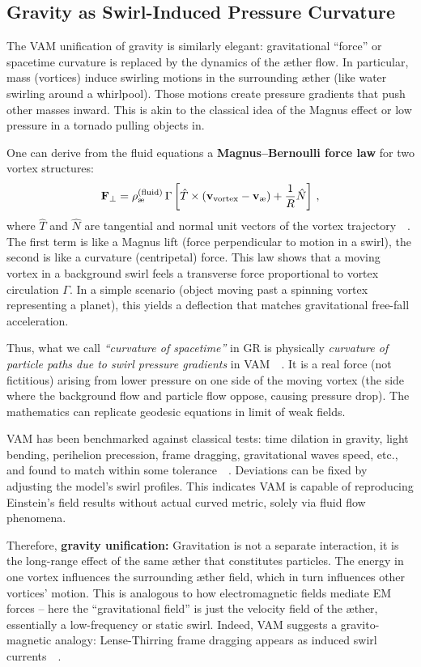 \documentclass[a4paper,12pt]{article}
\begin{document}
    \subsection{Gravity as Swirl-Induced Pressure Curvature}
    The VAM unification of gravity is similarly elegant: gravitational “force” or spacetime curvature is replaced by the dynamics of the æther flow. In particular, mass (vortices) induce swirling motions in the surrounding æther (like water swirling around a whirlpool). Those motions create pressure gradients that push other masses inward. This is akin to the classical idea of the Magnus effect or low pressure in a tornado pulling objects in.

    One can derive from the fluid equations a \textbf{Magnus–Bernoulli force law} for two vortex structures:
    \[
        \mathbf{F}_\perp = \rho_{\text{\ae}}^{(\text{fluid})}\,\Gamma \left[ \hat{T} \times (\mathbf{v}_{\rm vortex}-\mathbf{v}_{\text{\ae}}) + \frac{1}{R}\hat{N} \right]\,,
    \]
    where $\hat{T}$ and $\hat{N}$ are tangential and normal unit vectors of the vortex trajectory~\cite{reference_145}~\cite{reference_146}. The first term is like a Magnus lift (force perpendicular to motion in a swirl), the second is like a curvature (centripetal) force. This law shows that a moving vortex in a background swirl feels a transverse force proportional to vortex circulation $\Gamma$. In a simple scenario (object moving past a spinning vortex representing a planet), this yields a deflection that matches gravitational free-fall acceleration.

    Thus, what we call \emph{“curvature of spacetime”} in GR is physically \emph{curvature of particle paths due to swirl pressure gradients} in VAM~\cite{reference_147}~\cite{reference_148}. It is a real force (not fictitious) arising from lower pressure on one side of the moving vortex (the side where the background flow and particle flow oppose, causing pressure drop). The mathematics can replicate geodesic equations in limit of weak fields.

    VAM has been benchmarked against classical tests: time dilation in gravity, light bending, perihelion precession, frame dragging, gravitational waves speed, etc., and found to match within some tolerance~\cite{reference_149}~\cite{reference_150}. Deviations can be fixed by adjusting the model’s swirl profiles. This indicates VAM is capable of reproducing Einstein’s field results without actual curved metric, solely via fluid flow phenomena.

    Therefore, \textbf{gravity unification:} Gravitation is not a separate interaction, it is the long-range effect of the same æther that constitutes particles. The energy in one vortex influences the surrounding æther field, which in turn influences other vortices’ motion. This is analogous to how electromagnetic fields mediate EM forces – here the “gravitational field” is just the velocity field of the æther, essentially a low-frequency or static swirl. Indeed, VAM suggests a gravito-magnetic analogy: Lense-Thirring frame dragging appears as induced swirl currents~\cite{reference_151}~\cite{reference_152}.
\end{document}
